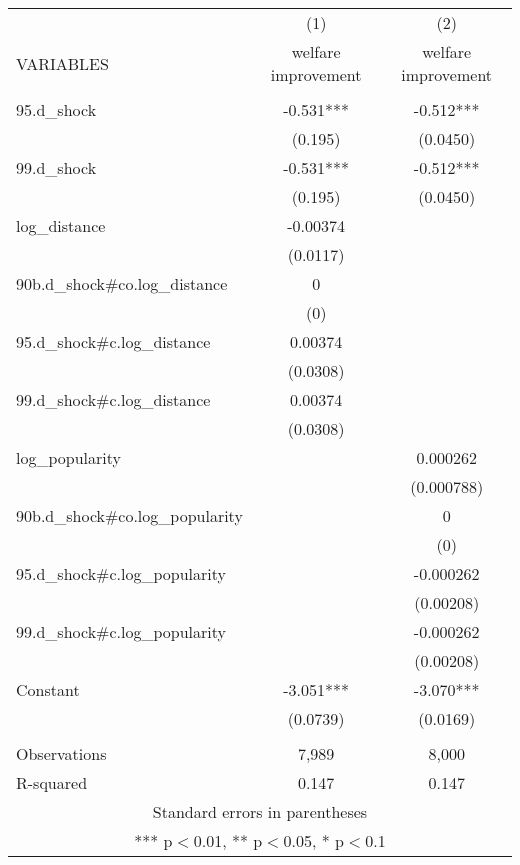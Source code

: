 
\setlength{\pdfpagewidth}{8.5in} \setlength{\pdfpageheight}{11in}

\begin{tabular}{lcc} \hline
 & (1) & (2) \\
VARIABLES & welfare improvement & welfare improvement \\ \hline
 &  &  \\
95.d\_shock & -0.531*** & -0.512*** \\
 & (0.195) & (0.0450) \\
99.d\_shock & -0.531*** & -0.512*** \\
 & (0.195) & (0.0450) \\
log\_distance & -0.00374 &  \\
 & (0.0117) &  \\
90b.d\_shock\#co.log\_distance & 0 &  \\
 & (0) &  \\
95.d\_shock\#c.log\_distance & 0.00374 &  \\
 & (0.0308) &  \\
99.d\_shock\#c.log\_distance & 0.00374 &  \\
 & (0.0308) &  \\
log\_popularity &  & 0.000262 \\
 &  & (0.000788) \\
90b.d\_shock\#co.log\_popularity &  & 0 \\
 &  & (0) \\
95.d\_shock\#c.log\_popularity &  & -0.000262 \\
 &  & (0.00208) \\
99.d\_shock\#c.log\_popularity &  & -0.000262 \\
 &  & (0.00208) \\
Constant & -3.051*** & -3.070*** \\
 & (0.0739) & (0.0169) \\
 &  &  \\
Observations & 7,989 & 8,000 \\
 R-squared & 0.147 & 0.147 \\ \hline
\multicolumn{3}{c}{ Standard errors in parentheses} \\
\multicolumn{3}{c}{ *** p$<$0.01, ** p$<$0.05, * p$<$0.1} \\
\end{tabular}

